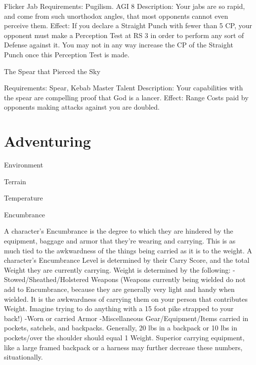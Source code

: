\documentclass[oneside,11pt,english]{book}
\begin{document}
 

Flicker Jab 
Requirements: Pugilism. AGI 8 
Description: Your jabs are so rapid, and come from such unorthodox angles, that most opponents cannot 
even perceive them. 
Effect: If you declare a Straight Punch with fewer than 5 CP, your opponent must make a Perception Test 
at RS 3 in order to perform any sort of Defense against it. You may not in any way increase the CP of the 
Straight Punch once this Perception Test is made. 

 

The Spear that Pierced the Sky 


Requirements: Spear, Kebab Master Talent 
Description: Your capabilities with the spear are compelling proof that God is a lancer. 
Effect: Range Costs paid by opponents making attacks against you are doubled. 

 

\chapter{Adventuring}\label{ch:adventuring}
\clearpage

Environment 

 

Terrain 

 

Temperature 

 

Encumbrance 

 

A character’s Encumbrance is the degree to which they are hindered by the equipment, baggage and 
armor that they’re wearing and carrying. This is as much tied to the awkwardness of the things being 
carried as it is to the weight. 
A character’s Encumbrance Level is determined by their Carry Score, and the total Weight they are 
currently carrying. Weight is determined by the following: 
-Stowed/Sheathed/Holstered Weapons (Weapons currently being wielded do not add to Encumbrance, 
because they are generally very light and handy when wielded. It is the awkwardness of carrying them on 
your person that contributes Weight. Imagine trying to do anything with a 15 foot pike strapped to your 
back!) 
-Worn or carried Armor 
-Miscellaneous Gear/Equipment/Items carried in pockets, satchels, and backpacks. Generally, 20 lbs in 
a backpack or 10 lbs in pockets/over the shoulder should equal 1 Weight. Superior carrying equipment, 
like a large framed backpack or a harness may further decrease these numbers, situationally. 
\end{document}
